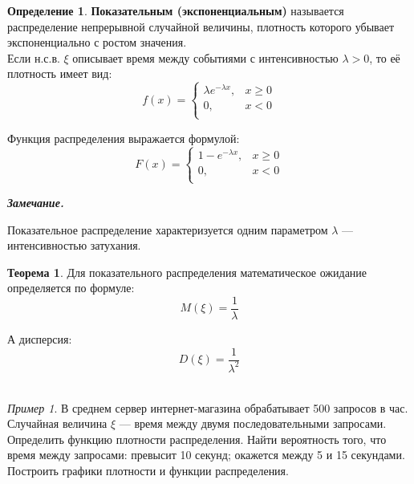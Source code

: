 \documentclass[12pt,a4paper]{article}
\theoremstyle{definition}
\newtheorem{definition}{Определение}[section]
\theoremstyle{definition}
\newtheorem{theorem}{Теорема}[section]
\theoremstyle{remark}
\newenvironment{remark}{
  \par\noindent\textbf{\textit{Замечание.}}~
}{\par}
\theoremstyle{corollary}
\theoremstyle{bolditalic}
\newtheorem{example}{Пример}[section]
\begin{document}
\begin{definition}
    \textbf{Показательным (экспоненциальным)} называется распределение непрерывной случайной величины, плотность которого убывает экспоненциально с ростом значения.\\

    Если н.с.в. $\xi$ описывает время между событиями с интенсивностью $\lambda > 0$, то её плотность имеет вид:
    \[
    f(x) = \begin{cases}
      \lambda e^{-\lambda x}, & x \geq 0 \\
      0, & x < 0 \\
    \end{cases}
    \]

    Функция распределения выражается формулой:
    \[
    F(x) = \begin{cases}
      1 - e^{-\lambda x}, & x \geq 0 \\
      0, & x < 0 \\
    \end{cases}
    \]
\end{definition}

\begin{remark}
    Показательное распределение характеризуется одним параметром $\lambda$ --- интенсивностью затухания.
\end{remark}

\begin{theorem}
    Для показательного распределения математическое ожидание определяется по формуле:
    \[
    M(\xi) = \frac{1}{\lambda}
    \]
    
    А дисперсия:
    \[
    D(\xi) = \frac{1}{\lambda^2}
    \]\\
    
\end{theorem}


\begin{example}
В среднем сервер интернет-магазина обрабатывает 500 запросов в час. Случайная величина $\xi$ — время между двумя последовательными запросами. Определить функцию плотности распределения. Найти вероятность того, что время между запросами: превысит 10 секунд; окажется между 5 и 15 секундами. Построить графики плотности и функции распределения.
\end{example}
\end{document}
